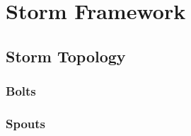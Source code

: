 \section{Storm Framework}
\label{sect:architecture}


\subsection{Storm Topology}
\label{sect:stormTopology}

\subsubsection{Bolts}

\subsubsection{Spouts}